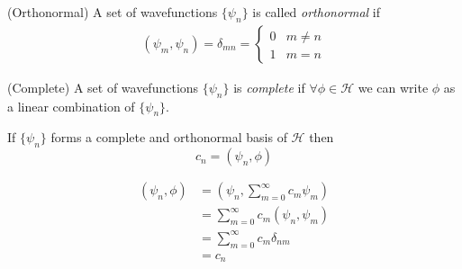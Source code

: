 \documentclass{article}
\begin{document}
\begin{definition}
	(Orthonormal) A set of wavefunctions $ \{\psi_n\} $ is called \textit{orthonormal} if
	\begin{align*}
		(\psi_m,\psi_n)=\delta_{mn}=\begin{cases}
			0& m\ne n\\
			1 & m =n 
		\end{cases}
	\end{align*}
\end{definition}
\begin{definition}
	(Complete) A set of wavefunctions $ \{\psi_n\} $ is \textit{complete} if $ \forall\phi\in \mathcal H $ we can write $ \phi $ as a linear combination of $ \{\psi_n\} $.
\end{definition}

\begin{lemma}
	If $ \{\psi_n\} $ forms a complete and orthonormal basis of $ \mathcal H $ then
	\[
	  c_n=(\psi_n,\phi)
	\]
\end{lemma}
\pf
\begin{align*}
	(\psi_n,\phi)&=\left(\psi_n,\sum_{m=0}^\infty c_m\psi_m\right) \\
		     &= \sum_{m=0}^\infty c_m(\psi_n,\psi_m)\\
		     &= \sum_{m=0}^\infty c_m\delta_{nm}\\
		     &=c_n
\end{align*}
\end{document}
